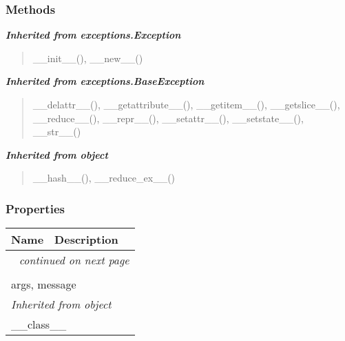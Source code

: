   \subsubsection{Methods}


\large{\textbf{\textit{Inherited from exceptions.Exception}}}

\begin{quote}
\_\_init\_\_(), \_\_new\_\_()
\end{quote}

\large{\textbf{\textit{Inherited from exceptions.BaseException}}}

\begin{quote}
\_\_delattr\_\_(), \_\_getattribute\_\_(), \_\_getitem\_\_(), \_\_getslice\_\_(), \_\_reduce\_\_(), \_\_repr\_\_(), \_\_setattr\_\_(), \_\_setstate\_\_(), \_\_str\_\_()
\end{quote}

\large{\textbf{\textit{Inherited from object}}}

\begin{quote}
\_\_hash\_\_(), \_\_reduce\_ex\_\_()
\end{quote}


  \subsubsection{Properties}

    \vspace{-1cm}
\hspace{\varindent}\begin{longtable}{|p{\varnamewidth}|p{\vardescrwidth}|l}
\cline{1-2}
\cline{1-2} \centering \textbf{Name} & \centering \textbf{Description}& \\
\cline{1-2}
\endhead\cline{1-2}\multicolumn{3}{r}{\small\textit{continued on next page}}\\\endfoot\cline{1-2}
\endlastfoot\multicolumn{2}{|l|}{\textit{Inherited from exceptions.BaseException}}\\
\multicolumn{2}{|p{\varwidth}|}{\raggedright args, message}\\
\cline{1-2}
\multicolumn{2}{|l|}{\textit{Inherited from object}}\\
\multicolumn{2}{|p{\varwidth}|}{\raggedright \_\_class\_\_}\\
\cline{1-2}
\end{longtable}

